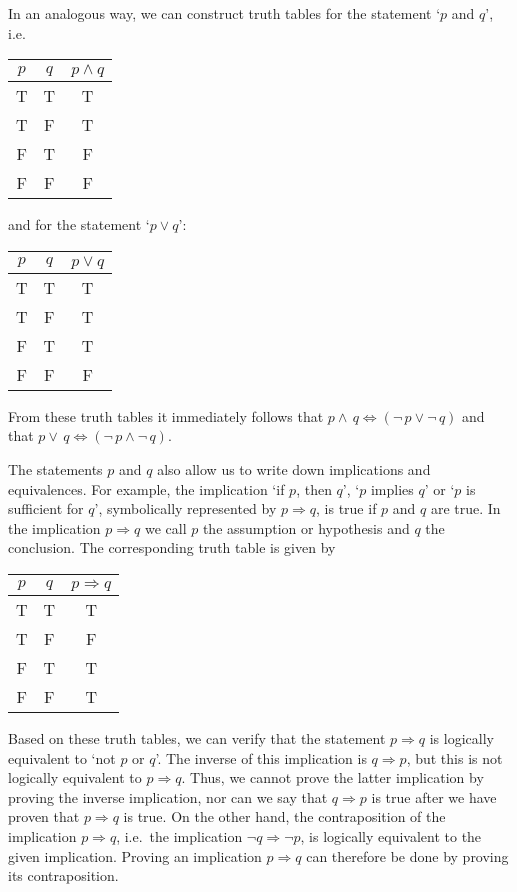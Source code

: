 In an analogous way, we can construct truth tables for the statement `$p$ and $q$', i.e.
\begin{center}
\begin{tabular}{cc|c}
     $p$&$q$& $p\wedge q$  \\\hline
     T&T&T\\
     T&F&T\\
     F&T&F\\
     F&F&F
\end{tabular}
\end{center}
and for the statement `$p\vee q$':
\begin{center}
\begin{tabular}{cc|c}
     $p$&$q$& $p\vee q$  \\\hline
     T&T&T\\
     T&F&T\\
     F&T&T\\
     F&F&F
\end{tabular}
\end{center}
From these truth tables it immediately follows that $p\wedge\,q\Longleftrightarrow (\neg\,p\vee\neg\,q)$ and that $p\vee\,q\Longleftrightarrow (\neg\,p\wedge\neg\,q)$. 

The statements $p$ and $q$ also allow us to write down implications and equivalences. For example, the implication `if $p$, then $q$', `$p$ implies $q$' or `$p$ is sufficient for $q$', symbolically represented by $p\Rightarrow q$, is true if $ p$ and $q$ are true. In the implication $p\Rightarrow q$ we call $p$ the assumption or hypothesis and $q$ the conclusion. The corresponding truth table is given by
\begin{center}
\begin{tabular}{cc|c}
     $p$&$q$& $p\Rightarrow q$  \\\hline
     T&T&T\\
     T&F&F\\
     F&T&T\\
     F&F&T
\end{tabular}
\end{center}
Based on these truth tables, we can verify that the statement $p\Rightarrow q$ is logically equivalent to `not $p$ or $q$'. The inverse of this implication is $q\Rightarrow p$, but this is not logically equivalent to $p\Rightarrow q$. Thus, we cannot prove the latter implication by proving the inverse implication, nor can we say that $q\Rightarrow p$ is true after we have proven that $p\Rightarrow q$ is true. On the other hand, the contraposition of the implication $p\Rightarrow q$, i.e.\ the implication $\neg q\Rightarrow\neg p$, is logically equivalent to the given implication. Proving an implication $p\Rightarrow q$ can therefore be done by proving its contraposition. 

